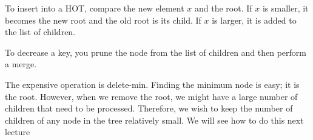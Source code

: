 \documentclass{article}
\begin{document}
To insert into a HOT, compare the new element $x$ and the root.  If
$x$ is smaller, it becomes the new root and the old root is its child.
If $x$ is larger, it is added to the list of children.

To decrease a key, you prune the node from the list of children and
then perform a merge.

The expensive operation is delete-min.  Finding the minimum node is
easy; it is the root.  However, when we remove the root, we might have
a large number of children that need to be processed.  Therefore, we
wish to keep the number of children of any node in the tree relatively
small.  We will see how to do this next lecture
\end{document}
